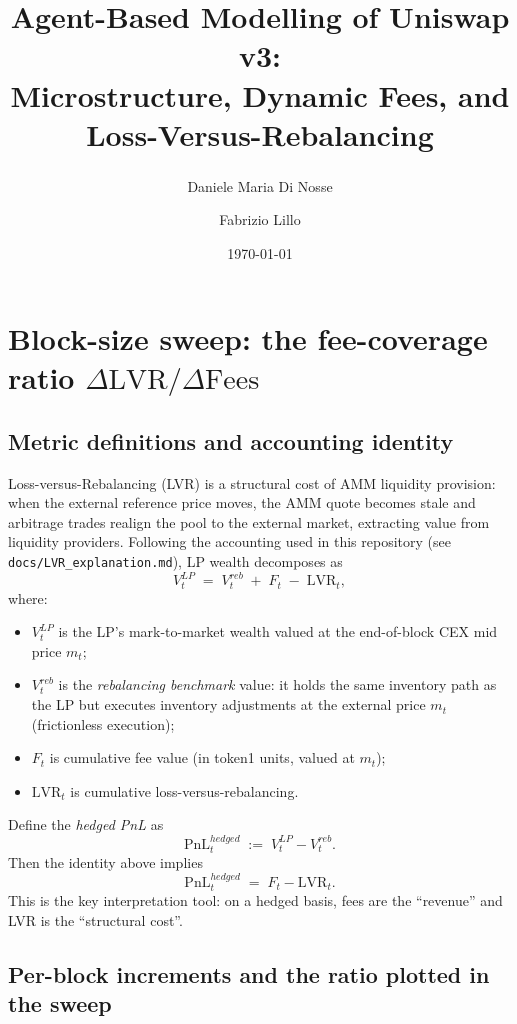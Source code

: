 \documentclass[11pt]{article}
\title{Agent-Based Modelling of Uniswap v3:\\
Microstructure, Dynamic Fees, and Loss-Versus-Rebalancing}
\author[1]{Daniele Maria Di Nosse\textsuperscript{\dag}}
\author[1]{Fabrizio Lillo}
\affil[1]{Scuola Normale Superiore, Pisa, Italy}
\date{\today}
\begin{document}
\section{Block-size sweep: the fee-coverage ratio \texorpdfstring{$\Delta\mathrm{LVR}/\Delta\mathrm{Fees}$}{ΔLVR/ΔFees}}

\subsection{Metric definitions and accounting identity}

Loss-versus-Rebalancing (LVR) is a structural cost of AMM liquidity provision: when the external reference price
moves, the AMM quote becomes stale and arbitrage trades realign the pool to the external market, extracting value
from liquidity providers. Following the accounting used in this repository (see \texttt{docs/LVR\_explanation.md}),
LP wealth decomposes as
\begin{equation}
  V^{LP}_t \;=\; V^{reb}_t \;+\; F_t \;-\; \mathrm{LVR}_t,
\end{equation}
where:
\begin{itemize}
  \item $V^{LP}_t$ is the LP's mark-to-market wealth valued at the end-of-block CEX mid price $m_t$;
  \item $V^{reb}_t$ is the \emph{rebalancing benchmark} value: it holds the same inventory path as the LP but executes
        inventory adjustments at the external price $m_t$ (frictionless execution);
  \item $F_t$ is cumulative fee value (in token1 units, valued at $m_t$);
  \item $\mathrm{LVR}_t$ is cumulative loss-versus-rebalancing.
\end{itemize}

Define the \emph{hedged PnL} as
\begin{equation}
  \mathrm{PnL}^{hedged}_t \;:=\; V^{LP}_t - V^{reb}_t.
\end{equation}
Then the identity above implies
\begin{equation}
  \mathrm{PnL}^{hedged}_t \;=\; F_t - \mathrm{LVR}_t.
  \label{eq:hedged_pnl_identity}
\end{equation}
This is the key interpretation tool: on a hedged basis, fees are the ``revenue'' and LVR is the ``structural cost''.

\subsection{Per-block increments and the ratio plotted in the sweep}
\end{document}
